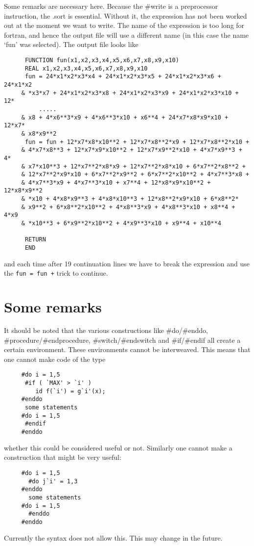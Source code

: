 Some remarks are necessary here. Because the \#write is a preprocessor 
instruction, the .sort is essential. Without it, the 
expression has not been worked out at the moment we want to write. The name 
of the expression is too long for fortran, and hence the 
output file will use a different name (in this case the name `fun' was 
selected). The output file looks like
\begin{verbatim}
      FUNCTION fun(x1,x2,x3,x4,x5,x6,x7,x8,x9,x10)
      REAL x1,x2,x3,x4,x5,x6,x7,x8,x9,x10
      fun = 24*x1*x2*x3*x4 + 24*x1*x2*x3*x5 + 24*x1*x2*x3*x6 + 24*x1*x2
     & *x3*x7 + 24*x1*x2*x3*x8 + 24*x1*x2*x3*x9 + 24*x1*x2*x3*x10 + 12*
          .....
     & x8 + 4*x6**3*x9 + 4*x6**3*x10 + x6**4 + 24*x7*x8*x9*x10 + 12*x7*
     & x8*x9**2
      fun = fun + 12*x7*x8*x10**2 + 12*x7*x8**2*x9 + 12*x7*x8**2*x10 + 
     & 4*x7*x8**3 + 12*x7*x9*x10**2 + 12*x7*x9**2*x10 + 4*x7*x9**3 + 4*
     & x7*x10**3 + 12*x7**2*x8*x9 + 12*x7**2*x8*x10 + 6*x7**2*x8**2 + 
     & 12*x7**2*x9*x10 + 6*x7**2*x9**2 + 6*x7**2*x10**2 + 4*x7**3*x8 + 
     & 4*x7**3*x9 + 4*x7**3*x10 + x7**4 + 12*x8*x9*x10**2 + 12*x8*x9**2
     & *x10 + 4*x8*x9**3 + 4*x8*x10**3 + 12*x8**2*x9*x10 + 6*x8**2*
     & x9**2 + 6*x8**2*x10**2 + 4*x8**3*x9 + 4*x8**3*x10 + x8**4 + 4*x9
     & *x10**3 + 6*x9**2*x10**2 + 4*x9**3*x10 + x9**4 + x10**4

      RETURN
      END
\end{verbatim}
and each time after 19 continuation lines we have to break the expression 
and use the \verb:fun = fun +: trick to continue.


\section{Some remarks}
It should be noted that the various constructions like 
\#do/\#enddo, 
\#procedure/\#endprocedure, 
\#switch/\#endswitch and 
\#if/\#endif all 
create a certain environment. These environments cannot be interweaved. This 
means that one cannot make code of the type
\begin{verbatim}
     #do i = 1,5
      #if ( `MAX' > `i' )
         id f(`i') = g`i'(x);
     #enddo
      some statements
     #do i = 1,5
      #endif
     #enddo
\end{verbatim}
whether this could be considered useful or not. Similarly one cannot make a 
construction that might be very useful:
\begin{verbatim}
     #do i = 1,5
       #do j`i' = 1,3
     #enddo
       some statements
     #do i = 1,5
       #enddo
     #enddo
\end{verbatim}
Currently the syntax does not allow this. This may change in the future.



